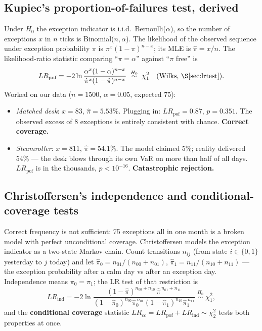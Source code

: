 \documentclass[11pt,a4paper]{article}
\begin{document}
\subsection{Kupiec's proportion-of-failures test, derived}
\label{sec:kupiec}
Under $H_0$ the exception indicator is i.i.d.\ Bernoulli($\alpha$), so the
number of exceptions $x$ in $n$ ticks is Binomial($n,\alpha$). The likelihood
of the observed sequence under exception probability $\pi$ is
$\pi^{x}(1-\pi)^{n-x}$; its MLE is $\hat\pi=x/n$. The likelihood-ratio
statistic comparing ``$\pi=\alpha$'' against ``$\pi$ free'' is
\begin{equation}
LR_{\text{pof}}
=-2\ln\frac{\alpha^{x}(1-\alpha)^{n-x}}{\hat\pi^{x}(1-\hat\pi)^{n-x}}
\;\overset{H_0}{\sim}\;\chi^2_1
\quad\text{(Wilks, \S\ref{sec:lrtest})}.
\label{eq:kupiec}
\end{equation}
Worked on our data ($n=1500$, $\alpha=0.05$, expected $75$):
\begin{itemize}[itemsep=1pt]
\item \emph{Matched desk}: $x=83$, $\hat\pi=5.53\%$. Plugging in:
  $LR_{\text{pof}}=0.87$, $p=0.351$. The observed excess of 8 exceptions is
  entirely consistent with chance. \textbf{Correct coverage.}
\item \emph{Steamroller}: $x=811$, $\hat\pi=54.1\%$. The model claimed 5\%;
  reality delivered 54\% --- the desk blows through its own VaR on more than
  half of all days. $LR_{\text{pof}}$ is in the thousands, $p<10^{-16}$.
  \textbf{Catastrophic rejection.}
\end{itemize}

\subsection{Christoffersen's independence and conditional-coverage tests}
\label{sec:christoffersen}
Correct frequency is not sufficient: 75 exceptions all in one month is a
broken model with perfect unconditional coverage. Christoffersen models the
exception indicator as a two-state Markov chain. Count transitions
$n_{ij}$ (from state $i\in\{0,1\}$ yesterday to $j$ today) and let
$\hat\pi_0=n_{01}/(n_{00}+n_{01})$, $\hat\pi_1=n_{11}/(n_{10}+n_{11})$ ---
the exception probability after a calm day vs after an exception day.
Independence means $\pi_0=\pi_1$; the LR test of that restriction is
\begin{equation}
LR_{\text{ind}}
=-2\ln\frac{(1-\hat\pi)^{n_{00}+n_{10}}\,\hat\pi^{\,n_{01}+n_{11}}}
{(1-\hat\pi_0)^{n_{00}}\hat\pi_0^{\,n_{01}}
(1-\hat\pi_1)^{n_{10}}\hat\pi_1^{\,n_{11}}}
\;\overset{H_0}{\sim}\;\chi^2_1 ,
\label{eq:christ}
\end{equation}
and the \textbf{conditional coverage} statistic
$LR_{cc}=LR_{\text{pof}}+LR_{\text{ind}}\sim\chi^2_2$ tests both properties at
once.
\end{document}
